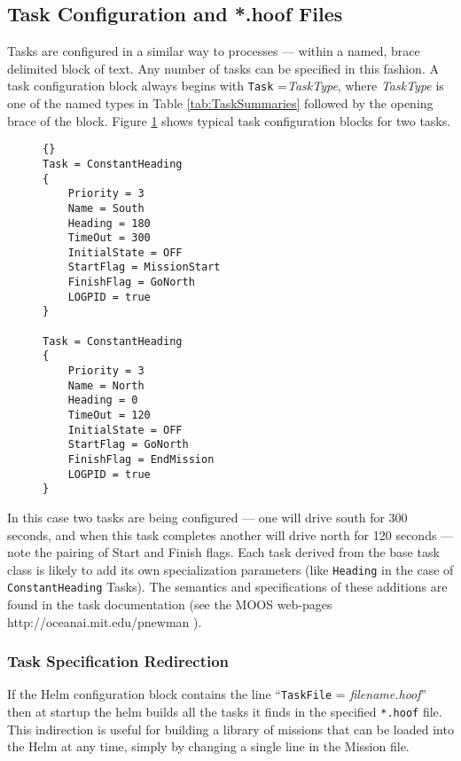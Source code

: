 \documentclass[a4paper,10pt]{article}
\newcommand{\Code}[1]{\texttt{#1} }
\newcommand{\code}[1]{\Code{#1} }
\begin{document}
\subsection{Task Configuration and *.hoof Files}
Tasks are configured in a similar way to processes --- within a
named, brace delimited block of text. Any number of tasks can be
specified in this fashion. A task configuration block always
begins with \code{Task}={\it{TaskType}}, where {\it{TaskType}} is
one of the named types in Table \ref{tab:TaskSummaries} followed
by the opening brace of the block. Figure \ref{fig:TaskSpec} shows
typical task configuration blocks for two tasks.
%
\begin{figure}[ht]\label{fig:TaskSpec}
\begin{lstlisting}[]{}
Task = ConstantHeading
{
    Priority = 3
    Name = South
    Heading = 180
    TimeOut = 300
    InitialState = OFF
    StartFlag = MissionStart
    FinishFlag = GoNorth
    LOGPID = true
}

Task = ConstantHeading
{
    Priority = 3
    Name = North
    Heading = 0
    TimeOut = 120
    InitialState = OFF
    StartFlag = GoNorth
    FinishFlag = EndMission
    LOGPID = true
}
\end{lstlisting}
\end{figure}
%
In this case two tasks are being configured --- one will drive south
for 300 seconds, and when this task completes another will drive
north for 120 seconds --- note the pairing of Start and Finish
flags. Each task derived from the base task class is likely to add
its own specialization parameters (like \code{Heading} in the case
of \code{ConstantHeading} Tasks). The semantics and specifications
of these additions are found in the task documentation (see the
MOOS web-pages http://oceanai.mit.edu/pnewman ).


\subsubsection{Task Specification Redirection} If the Helm
configuration block contains the line ``\code{TaskFile}=
{\it{filename.hoof}}'' then at startup the helm builds all the
tasks it finds in the specified \code{*.hoof} file. This
indirection is useful for building a library of missions that can
be loaded into the Helm at any time, simply by changing a single
line in the Mission file.
\end{document}
